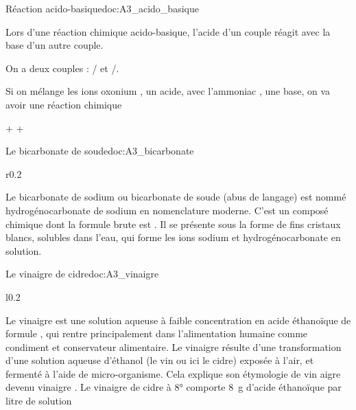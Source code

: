 
\begin{doc}{Réaction acido-basique}{doc:A3_acido_basique}
  \begin{encart}  
    Lors d'une réaction chimique acido-basique, l'acide d'un couple réagit avec la base d'un autre couple.
  \end{encart}
  
  \exemple On a deux couples : / et /.

  Si on mélange les ions oxonium , un acide, avec l'ammoniac , une base, on va avoir une réaction chimique
  \vspace*{-12pt}
  \begin{center}
     +  \reaction {} + 
  \end{center}
\end{doc}


\newpage
\vspace*{-40pt}

\begin{doc}{Le bicarbonate de soude}{doc:A3_bicarbonate}
  \begin{wrapfigure}{r}{0.2\linewidth}
    \vspace*{-38pt}
    \centering
  \end{wrapfigure}
  Le bicarbonate de sodium ou bicarbonate de soude (abus de langage) est nommé hydrogénocarbonate de sodium en nomenclature moderne.
  C’est un composé chimique dont la formule brute est .
  Il se présente sous la forme de fins cristaux blancs, solubles dans l’eau, qui forme les ions sodium  et hydrogénocarbonate  en solution.
\end{doc}

\begin{doc}{Le vinaigre de cidre}{doc:A3_vinaigre}
  \begin{wrapfigure}{l}{0.2\linewidth}
    \vspace*{-22pt}
    \centering
  \end{wrapfigure}
  Le vinaigre est une solution aqueuse à faible concentration en acide éthanoïque de
  formule , qui rentre principalement dans l'alimentation humaine comme condiment et conservateur alimentaire. 
  Le vinaigre résulte d'une transformation d'une solution aqueuse d'éthanol (le vin ou ici le cidre) exposée à l'air, et fermenté à l’aide de micro-organisme.
  Cela explique son étymologie de \og vin aigre \fg\; devenu \og vinaigre \fg.
  Le vinaigre de cidre à 8° comporte \qty{8}{\g} d’acide éthanoïque par litre de solution
\end{doc}

